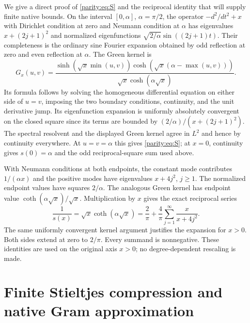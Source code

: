 We give a direct proof of \eqref{parity:eq:S} and the reciprocal identity
that will supply finite native bounds. On the interval
$[0,\alpha]$, $\alpha=\pi/2$, the operator $-d^2/dt^2+x$ with
Dirichlet condition at zero and Neumann condition at $\alpha$
has eigenvalues $x+(2j+1)^2$ and normalized eigenfunctions
$\sqrt{2/\alpha}\sin((2j+1)t)$. Their completeness is the ordinary
sine Fourier expansion obtained by odd reflection at zero and
even reflection at $\alpha$. The Green kernel is
\[
 G_x(u,v)=\frac{\sinh(\sqrt x\min(u,v))
                  \cosh(\sqrt x(\alpha-\max(u,v)))}
                    {\sqrt x\cosh(\alpha\sqrt x)}.
\]
Its formula follows by solving the homogeneous differential
equation on either side of $u=v$, imposing the two boundary
conditions, continuity, and the unit derivative jump. Its
eigenfunction expansion is uniformly absolutely convergent on
the closed square since its terms are bounded by
$(2/\alpha)/(x+(2j+1)^2)$. The spectral resolvent and the displayed
Green kernel agree in $L^2$ and hence by continuity everywhere.
At $u=v=\alpha$ this gives \eqref{parity:eq:S}; at $x=0$, continuity
gives $s(0)=\alpha$ and the odd reciprocal-square sum used above.

With Neumann conditions at both endpoints, the constant mode
contributes $1/(\alpha x)$ and the positive modes have
eigenvalues $x+4j^2$, $j\geq1$. The normalized endpoint values
have squares $2/\alpha$. The analogous Green kernel has endpoint
value $\coth(\alpha\sqrt x)/\sqrt x$. Multiplication by $x$ gives
the exact reciprocal series
\begin{equation}\label{parity:eq:reciprocal}
 \boxed{\frac1{s(x)}=\sqrt x\coth(\alpha\sqrt x)
  =\frac2\pi+\frac4\pi\sum_{j=1}^{\infty}\frac{x}{x+4j^2}.}
\end{equation}
The same uniformly convergent kernel argument justifies the
expansion for $x>0$. Both sides extend at zero to $2/\pi$.
Every summand is nonnegative. These identities are used on the
original axis $x>0$; no degree-dependent rescaling is made.

\section{Finite Stieltjes compression and native Gram approximation}

